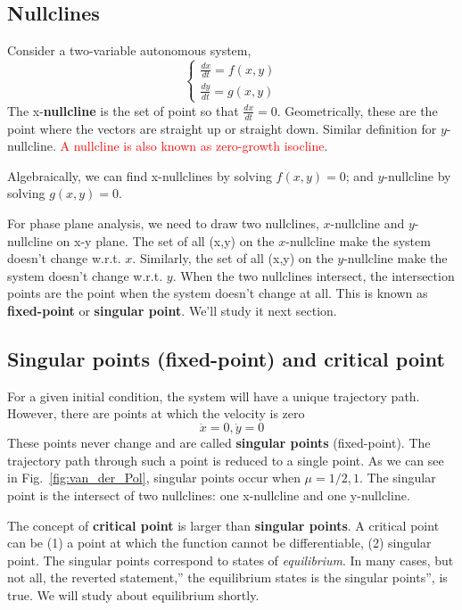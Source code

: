 \subsection{Nullclines}
\label{sec:nullclines}

Consider a two-variable autonomous system, 
\begin{equation}
  \label{eq:350}
  \left\{
    \begin{array}{cc}
      \frac{dx}{dt} = f(x,y)\\
      \frac{dy}{dt} = g(x,y)
    \end{array}
  \right.
\end{equation}
The x-{\bf nullcline} is the set of point so that
$\frac{dx}{dt}=0$. Geometrically, these are the point where the
vectors are straight up or straight down. Similar definition for
$y$-nullcline. 
\textcolor{red}{A nullcline is also known as zero-growth isocline}.

Algebraically, we can find x-nullclines by solving $f(x,y)=0$; and
$y$-nullcline by solving $g(x,y)=0$. 

For phase plane analysis, we need to draw two nullclines,
$x$-nullcline and $y$-nullcline on x-y plane. The set of all (x,y) on
the $x$-nullcline make the system doesn't change w.r.t. $x$. Similarly,
the set of all (x,y) on the $y$-nullcline make the system doesn't
change w.r.t. $y$. When the two nullclines intersect, the intersection
points are the point when the system doesn't change at all. This is
known as {\bf fixed-point} or {\bf singular point}. We'll study it
next section.


\subsection{Singular points (fixed-point) and critical point}
\label{sec:singular-points}


For a given initial condition, the system will have a unique
trajectory path. However, there are points at which the velocity is
zero
\begin{equation}
  \label{eq:583}
  \dot{x}=0, \dot{y} = 0
\end{equation}
These points never change and are called {\bf singular points}
(fixed-point). The trajectory path through such a point is reduced to
a single point. As we can see in Fig.~\ref{fig:van_der_Pol}, singular
points occur when $\mu=1/2, 1$.  The singular point is the intersect
of two nullclines: one x-nullcline and one y-nullcline.

The concept of {\bf critical point} is larger than
{\bf singular points}.  A critical point can be (1) a point at which
  the function cannot be differentiable, (2) singular point.
The singular points correspond to states of {\it equilibrium}. In many
cases, but not all, the reverted statement,'' the equilibrium states
is the singular points'', is true. We will study about equilibrium
shortly.


